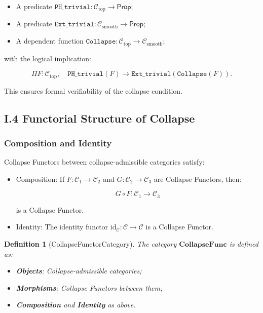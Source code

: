 \documentclass[11pt]{article}
\newtheorem{definition}[theorem]{Definition}
\begin{document}
\begin{itemize}
    \item A predicate \( \texttt{PH\_trivial} : \mathcal{C}_{\mathrm{top}} \to \mathsf{Prop} \);
    \item A predicate \( \texttt{Ext\_trivial} : \mathcal{C}_{\mathrm{smooth}} \to \mathsf{Prop} \);
    \item A dependent function \( \texttt{Collapse} : \mathcal{C}_{\mathrm{top}} \to \mathcal{C}_{\mathrm{smooth}} \);
\end{itemize}

with the logical implication:

\[
\Pi F : \mathcal{C}_{\mathrm{top}}, \quad \texttt{PH\_trivial}(F) \to \texttt{Ext\_trivial}(\texttt{Collapse}(F)).
\]

This ensures formal verifiability of the collapse condition.

\subsection*{I.4 Functorial Structure of Collapse}

\subsubsection*{Composition and Identity}

Collapse Functors between collapse-admissible categories satisfy:

\begin{itemize}
    \item Composition: If \( F : \mathcal{C}_1 \to \mathcal{C}_2 \) and \( G : \mathcal{C}_2 \to \mathcal{C}_3 \) are Collapse Functors, then:

\[
G \circ F : \mathcal{C}_1 \to \mathcal{C}_3
\]

is a Collapse Functor.

    \item Identity: The identity functor \( \mathrm{id}_{\mathcal{C}} : \mathcal{C} \to \mathcal{C} \) is a Collapse Functor.
\end{itemize}

\begin{definition}[CollapseFunctorCategory]
The category \( \mathbf{CollapseFunc} \) is defined as:

\begin{itemize}
    \item \textbf{Objects}: Collapse-admissible categories;
    \item \textbf{Morphisms}: Collapse Functors between them;
    \item \textbf{Composition} and \textbf{Identity} as above.
\end{itemize}
\end{definition}
\end{document}
